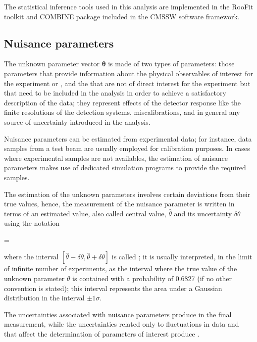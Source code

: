 The statistical inference tools used in this analysis are implemented in the RooFit toolkit \cite {roofit} and COMBINE package \cite{combine} included in the CMSSW software framework. 

\subsection{Nuisance parameters}

The unknown parameter vector $\bm{\theta}$ is made of two types of parameters: those parameters that provide information about the physical observables of interest for the experiment or , and the  that are not of direct interest for the experiment but that need to be included in the analysis in order to achieve a satisfactory description of the data; they represent effects of the detector response like the finite resolutions of the detection systems, miscalibrations, and in general any source of uncertainty introduced in the analysis.

Nuisance parameters can be estimated from experimental data; for instance, data samples from a test beam are usually employed for calibration purposes. In cases where experimental samples are not availables, the estimation of nuisance parameters makes use of dedicated simulation programs to provide the required samples.

The estimation of the unknown parameters involves certain deviations from their true values, hence, the measurement of the nuisance parameter is written in terms of an estimated value, also called central value,  $\hat{\theta}$ and its uncertainty $\delta \theta$ using the notation

\beqn
\theta=\hat{\theta}\pm\delta \theta  
\eeqn

\noindent where the interval $[\hat{\theta}-\delta \theta, \hat{\theta}+\delta \theta]$ is called ; it is usually interpreted, in the limit of infinite number of experiments, as the interval where the true value of the unknown parameter $\theta$ is contained with a probability of 0.6827 (if no other convention is stated); this interval represents the area under a Gaussian distribution in the interval $\pm 1\sigma$.    

The uncertainties associated with nuisance parameters produce  in the final measurement, while the uncertainties related only to fluctuations in data and that affect the determination of parameters of interest produce .

